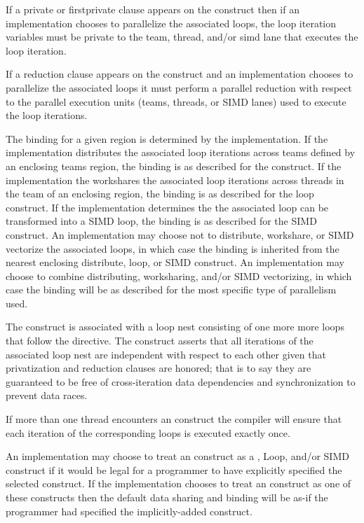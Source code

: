 
If a private or firstprivate clause appears on the  construct then
if an implementation chooses to parallelize the associated loops, the loop
iteration variables must be private to the team, thread, and/or simd lane that
executes the loop iteration.

If a reduction clause appears on the  construct and an
implementation chooses to parallelize the associated loops it must perform a
parallel reduction with respect to the parallel execution units (teams,
threads, or SIMD lanes) used to execute the loop iterations.


\binding
The binding for a given  region is determined by the implementation.
If the implementation distributes the associated loop iterations across teams
defined by an enclosing teams region, the binding is as described for the
 construct. If the implementation the workshares the associated loop
iterations across threads in the team of an enclosing  region, the
binding is as described for the loop construct. If the implementation
determines the the associated loop can be transformed into a SIMD loop, the
binding is as described for the SIMD construct. An implementation may choose
not to distribute, workshare, or SIMD vectorize the associated loops, in which
case the binding is inherited from the nearest enclosing distribute, loop, or
SIMD construct. An implementation may choose to combine distributing,
worksharing, and/or SIMD vectorizing, in which case the binding will be as
described for the most specific type of parallelism used.

\descr
The  construct is associated with a loop nest consisting of one more
more loops that follow the directive. The construct asserts that all iterations
of the associated loop nest are independent with respect to each other given
that privatization and reduction clauses are honored; that is
to say they are guaranteed to be free of cross-iteration data dependencies and
synchronization to prevent data races. 

If more than one thread encounters an  construct the compiler will
ensure that each iteration of the corresponding loops is executed exactly once.

An implementation may choose to treat an  construct as a
,
Loop, and/or SIMD construct if it would be legal for a programmer to have
explicitly specified the selected construct. If the implementation chooses to
treat an  construct as one of these constructs then the default data
sharing and binding will be as-if the programmer had specified the
implicitly-added construct.

